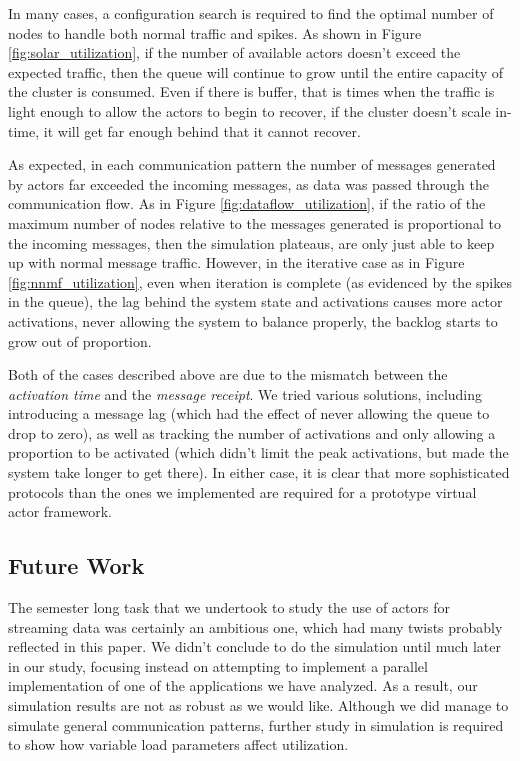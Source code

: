 \documentclass[draftclsnofoot,onecolumn,conference,11pt]{IEEEtran}
\begin{document}
In many cases, a configuration search is required to find the optimal number of nodes to handle both normal traffic and spikes. As shown in Figure \ref{fig:solar_utilization}, if the number of available actors doesn't exceed the expected traffic, then the queue will continue to grow until the entire capacity of the cluster is consumed. Even if there is buffer, that is times when the traffic is light enough to allow the actors to begin to recover, if the cluster doesn't scale in-time, it will get far enough behind that it cannot recover.

As expected, in each communication pattern the number of messages generated by actors far exceeded the incoming messages, as data was passed through the communication flow. As in Figure \ref{fig:dataflow_utilization}, if the ratio of the maximum number of nodes relative to the messages generated is proportional to the incoming messages, then the simulation plateaus, are only just able to keep up with normal message traffic. However, in the iterative case as in Figure \ref{fig:nnmf_utilization}, even when iteration is complete (as evidenced by the spikes in the queue), the lag behind the system state and activations causes more actor activations, never allowing the system to balance properly, the backlog starts to grow out of proportion.

Both of the cases described above are due to the mismatch between the \textit{activation time} and the \textit{message receipt}. We tried various solutions, including introducing a message lag (which had the effect of never allowing the queue to drop to zero), as well as tracking the number of activations and only allowing a proportion to be activated (which didn't limit the peak activations, but made the system take longer to get there). In either case, it is clear that more sophisticated protocols than the ones we implemented are required for a prototype virtual actor framework.

\subsection{Future Work}

The semester long task that we undertook to study the use of actors for streaming data was certainly an ambitious one, which had many twists probably reflected in this paper. We didn't conclude to do the simulation until much later in our study, focusing instead on attempting to implement a parallel implementation of one of the applications we have analyzed. As a result, our simulation results are not as robust as we would like. Although we did manage to simulate general communication patterns, further study in simulation is required to show how variable load parameters affect utilization.
\end{document}
